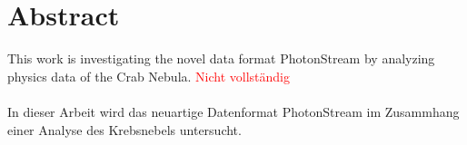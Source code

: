 \chapter{Abstract}

This work is investigating the novel data format PhotonStream by
analyzing physics data of the Crab Nebula. \textcolor{red}{Nicht vollständig}
\\
\\
In dieser Arbeit wird das neuartige Datenformat PhotonStream im
Zusammhang einer Analyse des Krebsnebels untersucht.
